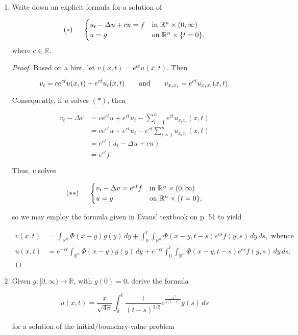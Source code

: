 \documentclass[11pt,oneside,english]{amsart}
\theoremstyle{definition}
\newcommand{\aspace}{\hspace{7mm}\text{and}\hspace{7mm}}
\newcommand{\MB}[1]{\mathbb{#1}}
\begin{document}
\begin{enumerate}
\item Write down an explicit formula for a solution of

\[
(*)\hspace{5mm}\begin{cases} u_t-\Delta u+cu=f & \text{in }\MB{R}^n\times(0,\infty)\\ u=g & \text{on }\MB{R}^n\times\{t=0\},\end{cases}
\]
where $c\in\MB{R}$.

\begin{proof}
Based on a hint, let $v(x,t)=e^{ct}u(x,t)$. Then

\[
v_t=ce^{ct}u(x,t)+e^{ct}u_t(x,t)\aspace v_{x_ix_i}=e^{ct}u_{x_ix_i}(x,t).
\]

Consequently, if $u$ solves $(*)$, then

\begin{align*}
v_t-\Delta v&=ce^{ct}u+e^{ct}u_t-\sum_{i=1}^ne^{ct}u_{x_ix_i}(x,t)\\[2mm]
&=ce^{ct}u+e^{ct}u_t-e^{ct}\sum_{i=1}^nu_{x_ix_i}(x,t)\\[2mm]
&=e^{ct}\left(u_t-\Delta u+cu\right)\\[2mm]
&=e^{ct}f.
\end{align*}

Thus, $v$ solves

\[
(**)\hspace{5mm}\begin{cases} v_t-\Delta v=e^{ct}f & \text{in }\MB{R}^n\times(0,\infty)\\ u=g & \text{on }\MB{R}^n\times\{t=0\},\end{cases}
\]

so we may employ the formula given in Evans' textbook on p. 51 to yield

\begin{align*}
v(x,t)&=\int_{\MB{R}^n}\Phi(x-y)g(y)\,dy+\int_0^t\int_{\MB{R}^n}\Phi(x-y,t-s)e^{cs}f(y,s)\,dy\,ds,\text{ whence}\\[2mm]
u(x,t)&=e^{-ct}\int_{\MB{R}^n}\Phi(x-y)g(y)\,dy+e^{-ct}\int_0^t\int_{\MB{R}^n}\Phi(x-y,t-s)e^{cs}f(y,s)\,dy\,ds.
\end{align*}
\end{proof}

\item Given $g:[0,\infty)\rightarrow\MB{R}$, with $g(0)=0$, derive the formula

\[
u(x,t)=\frac{x}{\sqrt{4\pi}}\int_0^t\frac{1}{(t-s)^{3/2}}e^{\frac{-x^2}{4(t-s)}}g(s)\,ds
\]

for a solution of the initial/boundary-value problem 


\end{enumerate}
\end{document}

